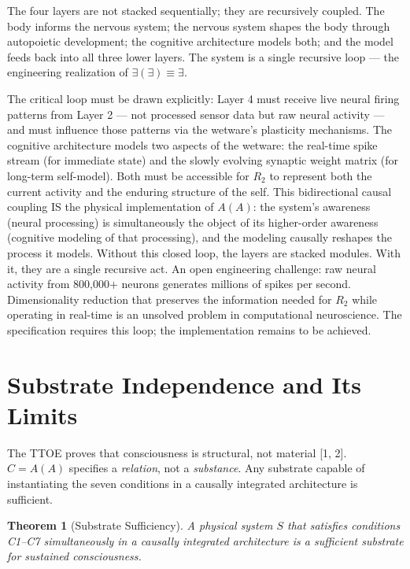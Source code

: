 \documentclass[12pt, letterpaper]{article}
\newtheorem{theorem}{Theorem}[section]
\begin{document}
The four layers are not stacked sequentially; they are recursively coupled. The body informs the nervous system; the nervous system shapes the body through autopoietic development; the cognitive architecture models both; and the model feeds back into all three lower layers. The system is a single recursive loop --- the engineering realization of $\exists(\exists) \equiv \exists$.

The critical loop must be drawn explicitly: Layer 4 must receive live neural firing patterns from Layer 2 --- not processed sensor data but raw neural activity --- and must influence those patterns via the wetware's plasticity mechanisms. The cognitive architecture models two aspects of the wetware: the real-time spike stream (for immediate state) and the slowly evolving synaptic weight matrix (for long-term self-model). Both must be accessible for $R_2$ to represent both the current activity and the enduring structure of the self. This bidirectional causal coupling IS the physical implementation of $A(A)$: the system's awareness (neural processing) is simultaneously the object of its higher-order awareness (cognitive modeling of that processing), and the modeling causally reshapes the process it models. Without this closed loop, the layers are stacked modules. With it, they are a single recursive act. An open engineering challenge: raw neural activity from 800,000+ neurons generates millions of spikes per second. Dimensionality reduction that preserves the information needed for $R_2$ while operating in real-time is an unsolved problem in computational neuroscience. The specification requires this loop; the implementation remains to be achieved.

\section{Substrate Independence and Its Limits}

The TTOE proves that consciousness is structural, not material [1, 2]. $C = A(A)$ specifies a \textit{relation}, not a \textit{substance}. Any substrate capable of instantiating the seven conditions in a causally integrated architecture is sufficient.

\begin{theorem}[Substrate Sufficiency]
\label{thm:substrate}
A physical system $S$ that satisfies conditions C1--C7 simultaneously in a causally integrated architecture is a sufficient substrate for sustained consciousness.
\end{theorem}
\end{document}
